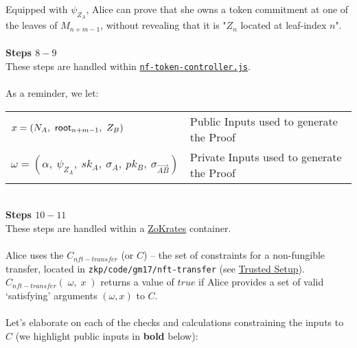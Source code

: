\noindent
Equipped with $\psi_{Z_A}$, Alice can prove that she owns a token commitment at one of the leaves of $M_{n+m-1}$, without revealing that it is "$Z_n$ located at leaf-index $n$".\\
\\
\textbf{Steps $8 - 9$}
\ \\
These steps are handled within \hyperref[sec:nf-token-controller]{\texttt{nf-token-controller.js}}.\\
\\
As a reminder, we let:
\begin{center}
  \begin{tabular}{l l}
    $x = (N_{A},\
          \mathsf{root}_{n+m-1},\
          Z_B)$ & Public Inputs used to generate the Proof\\
    $\omega = (\alpha,\
              \psi_{Z_A},\
              sk_A,\
              \sigma_{A},\
              pk_B,\
              \sigma_{\vec{AB}})$ & Private Inputs used to generate the Proof\\
  \end{tabular}
\end{center}
\ \\
\textbf{Steps $10 - 11$}
\ \\
These steps are handled within a \hyperref[sec:zokrates]{ZoKrates} container.\\
\\
Alice uses the $C_{nft-transfer}$ (or $C$) -- the set of constraints for a non-fungible transfer, located in \texttt{zkp/code/gm17/nft-transfer} (see \hyperref[sec:trustedSetup]{Trusted Setup}). $C_{nft-transfer}(\;\omega,\;x\;)$ returns a value of $true$ if Alice provides a set of valid `satisfying' arguments $(\omega, x)$ to $C$.\\
\\
Let's elaborate on each of the checks and calculations constraining the inputs to $C$ (we highlight public inputs in \textbf{bold} below):
